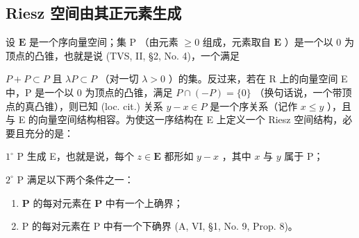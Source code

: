 \subsection{Riesz 空间由其正元素生成}

设 \(\mathbf{E}\) 是一个序向量空间；集 \(\mathrm{P}\) （由元素 \(\geqslant 0\) 组成，元素取自 \(\mathbf{E}\) ）是一个以 0 为顶点的凸锥，也就是说 (TVS, II, §2, No. 4)，一个满足

\(P + P \subset P\) 且 \(\lambda P \subset P\) （对一切 \(\lambda > 0\) ）的集。反过来，若在 R 上的向量空间 E 中，P 是一个以 0 为顶点的凸锥，满足 \(P \cap (-P) = \{0\}\) （换句话说，一个带顶点的真凸锥），则已知 (loc. cit.) 关系 \(y - x \in P\) 是一个序关系（记作 \(x \leqslant y\) ），且与 E 的向量空间结构相容。为使这一序结构在 E 上定义一个 Riesz 空间结构，必要且充分的是：

\(1^{\circ}\) P 生成 E，也就是说，每个 \(z \in \mathbf{E}\) 都形如 \(y - x\) ，其中 \(x\) 与 \(y\) 属于 P；

\(2^{\circ}\) P 满足以下两个条件之一：

\begin{enumerate}
\def\labelenumi{\alph{enumi})}
\item
  \(\mathbf{P}\) 的每对元素在 \(\mathbf{P}\) 中有一个上确界；
\item
  P 的每对元素在 P 中有一个下确界 (A, VI, §1, No. 9, Prop. 8)。
\end{enumerate}

